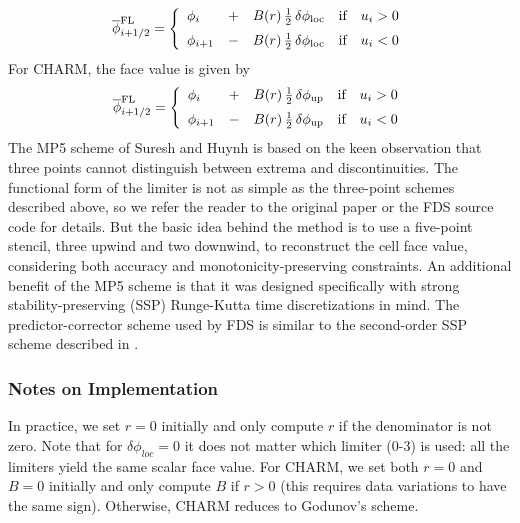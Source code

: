 \begin{equation}
\label{eqn_flux_limiter}
\overline{\phi}^{\rm FL}_{i+1/2} = \left\{ \begin{array}{lcll} \phi_i &+& B(r) \,\frac{1}{2} \,\delta \phi_{\rm loc} & \mbox{if} \quad u_i>0 \vspace{0.2 cm}\\
\phi_{i+1} &-& B(r) \,\frac{1}{2} \,\delta \phi_{\rm loc} & \mbox{if} \quad u_i<0 \end{array} \right.
\end{equation}
For CHARM, the face value is given by~\cite{Kempf:2003}
\begin{equation}
\label{eqn_charm_limiter}
\overline{\phi}^{\rm FL}_{i+1/2} = \left\{ \begin{array}{lcll} \phi_i &+& B(r) \,\frac{1}{2} \,\delta \phi_{\rm up} & \mbox{if} \quad u_i>0 \vspace{0.2 cm}\\
\phi_{i+1} &-& B(r) \,\frac{1}{2} \,\delta \phi_{\rm up} & \mbox{if} \quad u_i<0 \end{array} \right.
\end{equation}
The MP5 scheme of Suresh and Huynh \cite{Suresh:1997} is based on the keen observation that three points cannot distinguish between extrema and discontinuities.  The functional form of the limiter is not as simple as the three-point schemes described above, so we refer the reader to the original paper or the FDS source code for details.  But the basic idea behind the method is to use a five-point stencil, three upwind and two downwind, to reconstruct the cell face value, considering both accuracy and monotonicity-preserving constraints.  An additional benefit of the MP5 scheme is that it was designed specifically with strong stability-preserving (SSP) Runge-Kutta time discretizations in mind.  The predictor-corrector scheme used by FDS is similar to the second-order SSP scheme described in \cite{Gottlieb:2001}.


\subsubsection{Notes on Implementation}

In practice, we set $r=0$ initially and only compute $r$ if the denominator is not zero.  Note that for $\delta \phi_{loc}=0$ it does not matter which limiter (0-3) is used: all the limiters yield the same scalar face value.  For CHARM, we set both $r=0$ and $B=0$ initially and only compute $B$ if $r>0$ (this requires data variations to have the same sign). Otherwise, CHARM reduces to Godunov's scheme.

